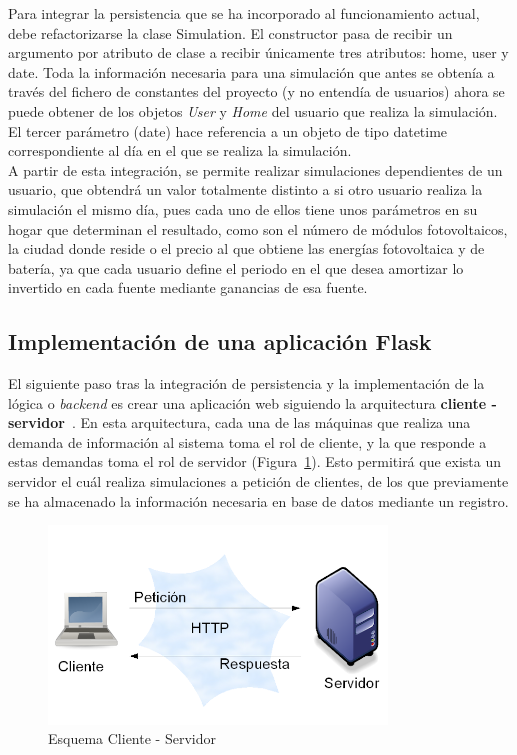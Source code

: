 Para integrar la persistencia que se ha incorporado al funcionamiento actual, debe refactorizarse la clase Simulation. El constructor pasa de recibir un argumento por atributo de clase a recibir únicamente tres atributos: home, user y date. Toda la información necesaria para una simulación que antes se obtenía a través del fichero de constantes del proyecto (y no entendía de usuarios) ahora se puede obtener de los objetos \textit{User} y \textit{Home} del usuario que realiza la simulación. El tercer parámetro (date) hace referencia a un objeto de tipo datetime correspondiente al día en el que se realiza la simulación.\\

A partir de esta integración, se permite realizar simulaciones dependientes de un usuario, que obtendrá un valor totalmente distinto a si otro usuario realiza la simulación el mismo día, pues cada uno de ellos tiene unos parámetros en su hogar que determinan el resultado, como son el número de módulos fotovoltaicos, la ciudad donde reside o el precio al que obtiene las energías fotovoltaica y de batería, ya que cada usuario define el periodo en el que desea amortizar lo invertido en cada fuente mediante ganancias de esa fuente.

\subsection{Implementación de una aplicación Flask}
El siguiente paso tras la integración de persistencia y la implementación de la lógica o \textit{backend} es crear una aplicación web siguiendo la arquitectura \textbf{cliente - servidor}~\cite{Goer04}. En esta arquitectura, cada una de las máquinas que realiza una demanda de información al sistema toma el rol de cliente, y la que responde a estas demandas toma el rol de servidor (Figura~\ref{fig:client-server}). Esto permitirá que exista un servidor el cuál realiza simulaciones a petición de clientes, de los que previamente se ha almacenado la información necesaria en base de datos mediante un registro.
\begin{figure}[!h]
            \centering
            \includegraphics[width=9cm]{figs/client-server.png}
            \caption{Esquema Cliente - Servidor}
            \label{fig:client-server}
\end{figure}

